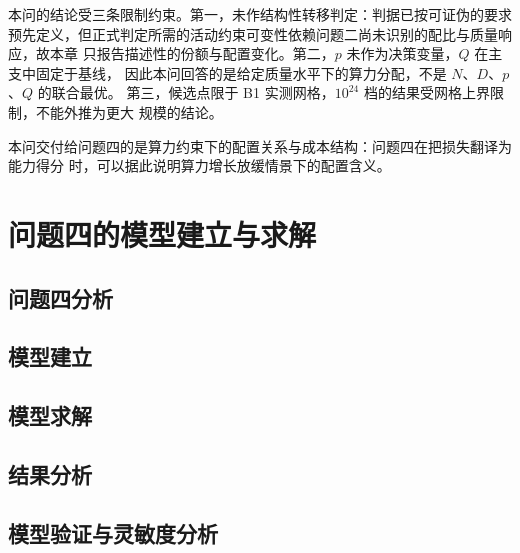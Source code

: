 \documentclass[bwprint]{gmcmthesis}
\numberwithin{equation}{section}
\numberwithin{figure}{section}
\numberwithin{table}{section}
\begin{document}
本问的结论受三条限制约束。第一，未作结构性转移判定：判据已按可证伪的要求
预先定义，但正式判定所需的活动约束可变性依赖问题二尚未识别的配比与质量响应，故本章
只报告描述性的份额与配置变化。第二，$p$ 未作为决策变量，$Q$ 在主支中固定于基线，
因此本问回答的是给定质量水平下的算力分配，不是 $N$、$D$、$p$、$Q$ 的联合最优。
第三，候选点限于 B1 实测网格，$10^{24}$ 档的结果受网格上界限制，不能外推为更大
规模的结论。

本问交付给问题四的是算力约束下的配置关系与成本结构：问题四在把损失翻译为能力得分
时，可以据此说明算力增长放缓情景下的配置含义。


\clearpage
\section{问题四的模型建立与求解}



\subsection{问题四分析}

\subsection{模型建立}

\subsection{模型求解}

\subsection{结果分析}

\subsection{模型验证与灵敏度分析}
\end{document}
